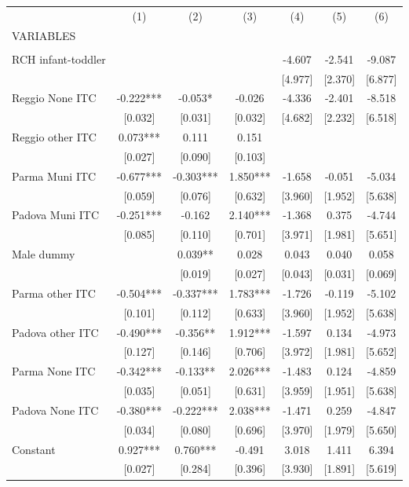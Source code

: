 \begin{tabular}{lcccccc} \hline
 & (1) & (2) & (3) & (4) & (5) & (6) \\
VARIABLES &  &  &  &  &  &  \\ \hline
 &  &  &  &  &  &  \\
RCH infant-toddler &  &  &  & -4.607 & -2.541 & -9.087 \\
 &  &  &  & [4.977] & [2.370] & [6.877] \\
Reggio None ITC & -0.222*** & -0.053* & -0.026 & -4.336 & -2.401 & -8.518 \\
 & [0.032] & [0.031] & [0.032] & [4.682] & [2.232] & [6.518] \\
Reggio other ITC & 0.073*** & 0.111 & 0.151 &  &  &  \\
 & [0.027] & [0.090] & [0.103] &  &  &  \\
Parma Muni ITC & -0.677*** & -0.303*** & 1.850*** & -1.658 & -0.051 & -5.034 \\
 & [0.059] & [0.076] & [0.632] & [3.960] & [1.952] & [5.638] \\
Padova Muni ITC & -0.251*** & -0.162 & 2.140*** & -1.368 & 0.375 & -4.744 \\
 & [0.085] & [0.110] & [0.701] & [3.971] & [1.981] & [5.651] \\
Male dummy &  & 0.039** & 0.028 & 0.043 & 0.040 & 0.058 \\
 &  & [0.019] & [0.027] & [0.043] & [0.031] & [0.069] \\
Parma other ITC & -0.504*** & -0.337*** & 1.783*** & -1.726 & -0.119 & -5.102 \\
 & [0.101] & [0.112] & [0.633] & [3.960] & [1.952] & [5.638] \\
Padova other ITC & -0.490*** & -0.356** & 1.912*** & -1.597 & 0.134 & -4.973 \\
 & [0.127] & [0.146] & [0.706] & [3.972] & [1.981] & [5.652] \\
Parma None ITC & -0.342*** & -0.133** & 2.026*** & -1.483 & 0.124 & -4.859 \\
 & [0.035] & [0.051] & [0.631] & [3.959] & [1.951] & [5.638] \\
Padova None ITC & -0.380*** & -0.222*** & 2.038*** & -1.471 & 0.259 & -4.847 \\
 & [0.034] & [0.080] & [0.696] & [3.970] & [1.979] & [5.650] \\
Constant & 0.927*** & 0.760*** & -0.491 & 3.018 & 1.411 & 6.394 \\
 & [0.027] & [0.284] & [0.396] & [3.930] & [1.891] & [5.619] \\

\end{tabular}
